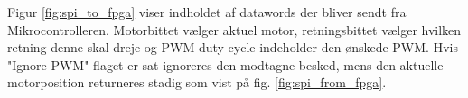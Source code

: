 

Figur \ref{fig:spi_to_fpga} viser indholdet af datawords der bliver sendt fra Mikrocontrolleren. 
Motorbittet vælger aktuel motor, retningsbittet vælger hvilken retning denne skal dreje og PWM duty cycle indeholder den ønskede PWM. 
Hvis "Ignore PWM" flaget er sat ignoreres den modtagne besked, mens den aktuelle motorposition returneres stadig som vist på fig.  \ref{fig:spi_from_fpga}. 

